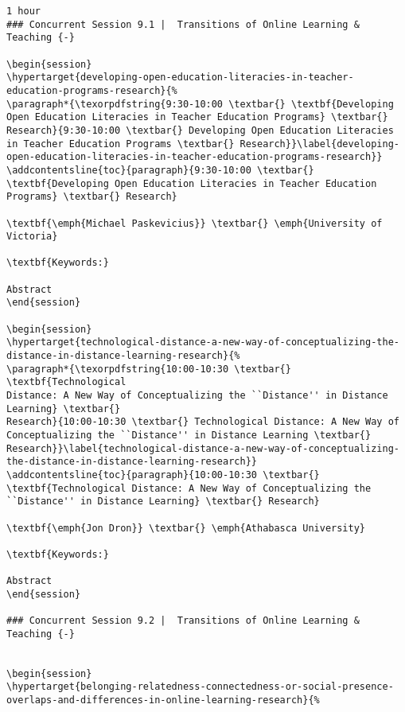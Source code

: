 \documentclass[
]{book}
\begin{document}
\begin{verbatim}
1 hour
### Concurrent Session 9.1 |  Transitions of Online Learning & Teaching {-}

\begin{session}
\hypertarget{developing-open-education-literacies-in-teacher-education-programs-research}{%
\paragraph*{\texorpdfstring{9:30-10:00 \textbar{} \textbf{Developing
Open Education Literacies in Teacher Education Programs} \textbar{}
Research}{9:30-10:00 \textbar{} Developing Open Education Literacies in Teacher Education Programs \textbar{} Research}}\label{developing-open-education-literacies-in-teacher-education-programs-research}}
\addcontentsline{toc}{paragraph}{9:30-10:00 \textbar{}
\textbf{Developing Open Education Literacies in Teacher Education
Programs} \textbar{} Research}

\textbf{\emph{Michael Paskevicius}} \textbar{} \emph{University of
Victoria}

\textbf{Keywords:}

Abstract
\end{session}

\begin{session}
\hypertarget{technological-distance-a-new-way-of-conceptualizing-the-distance-in-distance-learning-research}{%
\paragraph*{\texorpdfstring{10:00-10:30 \textbar{} \textbf{Technological
Distance: A New Way of Conceptualizing the ``Distance'' in Distance
Learning} \textbar{}
Research}{10:00-10:30 \textbar{} Technological Distance: A New Way of Conceptualizing the ``Distance'' in Distance Learning \textbar{} Research}}\label{technological-distance-a-new-way-of-conceptualizing-the-distance-in-distance-learning-research}}
\addcontentsline{toc}{paragraph}{10:00-10:30 \textbar{}
\textbf{Technological Distance: A New Way of Conceptualizing the
``Distance'' in Distance Learning} \textbar{} Research}

\textbf{\emph{Jon Dron}} \textbar{} \emph{Athabasca University}

\textbf{Keywords:}

Abstract
\end{session}

### Concurrent Session 9.2 |  Transitions of Online Learning & Teaching {-}


\begin{session}
\hypertarget{belonging-relatedness-connectedness-or-social-presence-overlaps-and-differences-in-online-learning-research}{%

\end{verbatim}
\end{document}
